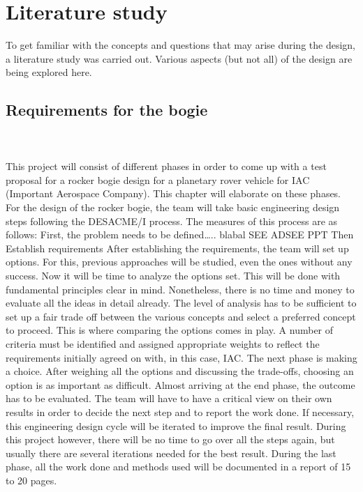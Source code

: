 
\chapter{Literature study}
\label{chapter:title}
To get familiar with the concepts and questions that may arise during the design, a literature study was carried out. Various aspects (but not all) of the design are being explored here.
\section{Requirements for the bogie}\\ \\


This project will consist of different phases in order to come up with a test proposal for a rocker bogie design for a planetary rover vehicle for IAC (Important Aerospace Company). This chapter will elaborate on these phases.
For the design of the rocker bogie, the team will take basic engineering design steps following the DESACME/I process. The measures of this process are as follows:
First, the problem needs to be defined….. blabal SEE ADSEE PPT
Then Establish requirements
After establishing the requirements, the team will set up options. For this, previous approaches will be studied, even the ones without any success. 
Now it will be time to analyze the options set. This will be done with fundamental principles clear in mind. Nonetheless, there is no time and money to evaluate all the ideas in detail already. The level of analysis has to be sufficient to set up a fair trade off between the various concepts and select a preferred concept to proceed.
This is where comparing the options comes in play. A number of criteria must be identified and assigned appropriate weights to reflect the requirements initially agreed on with, in this case, IAC.
The next phase is making a choice. After weighing all the options and discussing the trade-offs, choosing an option is as important as difficult. 
Almost arriving at the end phase, the outcome has to be evaluated. The team will have to have a critical view on their own results in order to decide the next step and to report the work done.
If necessary, this engineering design cycle will be iterated to improve the final result. During this project however, there will be no time to go over all the steps again, but usually there are several iterations needed for the best result.
During the last phase, all the work done and methods used will be documented in a report of 15 to 20 pages.




